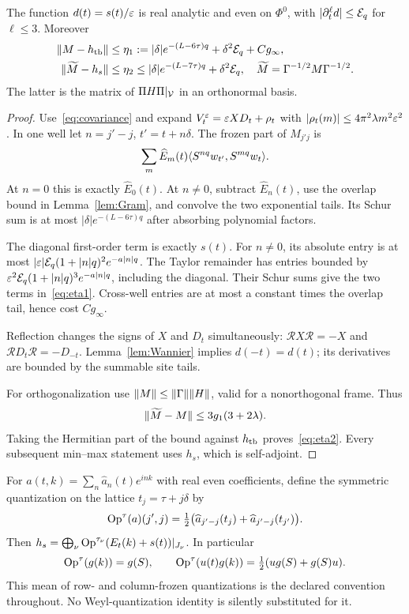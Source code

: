 \begin{proposition}\label{prop:compression}
The function $d(t)=s(t)/\varepsilon$ is real analytic and even on $\Phi^0$, with $|\partial_t^\ell d|\le\mathcal E_q$ for $\ell\le3$. Moreover
\begin{align}
 \lVert M-h_{\rm tb}\rVert&\le\eta_1
  :=|\delta|e^{-(L-6\tau)q}+\delta^2\mathcal E_q+Cg_\infty,\label{eq:eta1}\\
 \lVert \widetilde M-h_s\rVert&\le\eta_2
  \le |\delta|e^{-(L-7\tau)q}+\delta^2\mathcal E_q,
 \quad \widetilde M=\Gamma^{-1/2}M\Gamma^{-1/2}.
 \label{eq:eta2}
\end{align}
The latter is the matrix of $\Pi H\Pi|_{\mathcal V}$ in an orthonormal basis.
\end{proposition}
\begin{proof}
Use~\eqref{eq:covariance} and expand $V_t^\varepsilon=\varepsilon XD_t+\rho_t$ with $|\rho_t(m)|\le4\pi^2\lambda m^2\varepsilon^2$. In one well let $n=j'-j$, $t'=t+n\delta$. The frozen part of $M_{j'j}$ is
\[
 \sum_m\widehat E_m(t)
 \langle S^{nq}w_{t'},S^{mq}w_t\rangle.
\]
At $n=0$ this is exactly $\widehat E_0(t)$. At $n\ne0$, subtract $\widehat E_n(t)$, use the overlap bound in Lemma~\ref{lem:Gram}, and convolve the two exponential tails. Its Schur sum is at most $|\delta|e^{-(L-6\tau)q}$ after absorbing polynomial factors.

The diagonal first-order term is exactly $s(t)$. For $n\ne0$, its absolute entry is at most
$|\varepsilon|\mathcal E_q(1+|n|q)^2e^{-a|n|q}$. The Taylor remainder has entries bounded by
$\varepsilon^2\mathcal E_q(1+|n|q)^3e^{-a|n|q}$, including the diagonal. Their Schur sums give the two terms in~\eqref{eq:eta1}. Cross-well entries are at most a constant times the overlap tail, hence cost $Cg_\infty$.

Reflection changes the signs of $X$ and $D_t$ simultaneously: $\mathcal RX\mathcal R=-X$ and $\mathcal RD_t\mathcal R=-D_{-t}$. Lemma~\ref{lem:Wannier} implies $d(-t)=d(t)$; its derivatives are bounded by the summable site tails.

For orthogonalization use $\lVert M\rVert\le\lVert \Gamma\rVert\lVert H\rVert$, valid for a nonorthogonal frame. Thus
\[
 \lVert \widetilde M-M\rVert\le3g_1(3+2\lambda).
\]
Taking the Hermitian part of the bound against $h_{\rm tb}$ proves~\eqref{eq:eta2}. Every subsequent min--max statement uses $h_s$, which is self-adjoint.
\end{proof}

For $a(t,k)=\sum_n\widehat a_n(t)e^{ink}$ with real even coefficients, define the symmetric quantization on the lattice $t_j=\tau+ j\delta$ by
\begin{equation}\label{eq:quantization}
 \operatorname{Op}^\tau(a)(j',j)
 =\tfrac12\bigl(\widehat a_{j'-j}(t_j)
                +\widehat a_{j'-j}(t_{j'})\bigr).
\end{equation}
Then $h_s=\bigoplus_\nu\operatorname{Op}^{\tau_\nu}(E_t(k)+s(t))|_{J_\nu}$. In particular
\[
 \operatorname{Op}^\tau(g(k))=g(S),\qquad
 \operatorname{Op}^\tau(u(t)g(k))=\tfrac12(ug(S)+g(S)u).
\]
This mean of row- and column-frozen quantizations is the declared convention throughout. No Weyl-quantization identity is silently substituted for it.

\label{end:frames}
